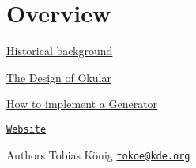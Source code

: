 \hypertarget{index_okular_overview}{}\section{Overview}\label{index_okular_overview}

\begin{DoxyItemize}
\item \hyperlink{okular_history}{Historical background}
\item \hyperlink{okular_design}{The Design of Okular}
\item \hyperlink{okular_generators}{How to implement a Generator}
\item \href{http://www.okular.org}{\tt Website}
\end{DoxyItemize}

\begin{DoxyAuthor}{Authors}
Tobias König \href{mailto:tokoe@kde.org}{\tt tokoe@kde.\+org}
\end{DoxyAuthor}
